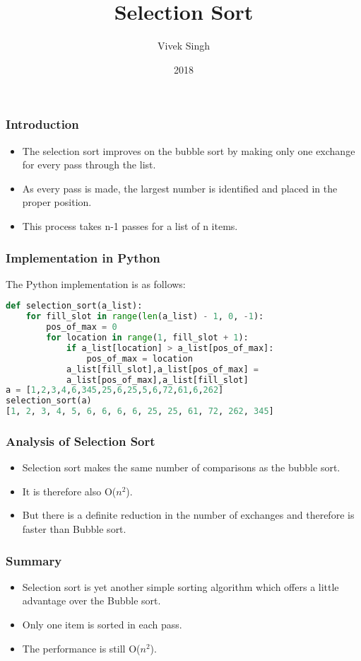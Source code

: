\documentclass{beamer}
\title{Selection Sort}
\author{Vivek Singh}
\institute{Information Systems Decision Sciences (ISDS)\\
MUMA College of Business\\
University of South Florida \\
Tampa, Florida}
\date{2018}
\begin{document}
\frame{\titlepage}
\begin{frame}
\frametitle{Introduction}
\begin{itemize}
\item The selection sort improves on the bubble sort by making only one exchange for every pass through the list.
\item As every pass is made, the largest number is identified and placed in the proper position.
\item This process takes n-1 passes for a list of n items.
\end{itemize}
\end{frame}


\begin{frame}[fragile]
\frametitle{Implementation in Python}
The Python implementation is as follows:
\begin{lstlisting}[language=Python]
def selection_sort(a_list):
    for fill_slot in range(len(a_list) - 1, 0, -1):
        pos_of_max = 0
        for location in range(1, fill_slot + 1):
            if a_list[location] > a_list[pos_of_max]:
                pos_of_max = location
            a_list[fill_slot],a_list[pos_of_max] = 
            a_list[pos_of_max],a_list[fill_slot]
a = [1,2,3,4,6,345,25,6,25,5,6,72,61,6,262]
selection_sort(a)
[1, 2, 3, 4, 5, 6, 6, 6, 6, 25, 25, 61, 72, 262, 345]
\end{lstlisting}
\end{frame}


\begin{frame}
\frametitle{Analysis of Selection Sort}
\begin{itemize}
\item Selection sort makes the same number of comparisons as the bubble sort.
\item It is therefore also O($n^2$).
\item But there is a definite reduction in the number of exchanges and therefore is faster than Bubble sort.
\end{itemize}
\end{frame}

\begin{frame}
\frametitle{Summary}
\begin{itemize}
\item Selection sort is yet another simple sorting algorithm which offers a little advantage over the Bubble sort.
\item Only one item is sorted in each pass.
\item The performance is still O($n^2$).
\end{itemize}
\end{frame}
\end{document}

